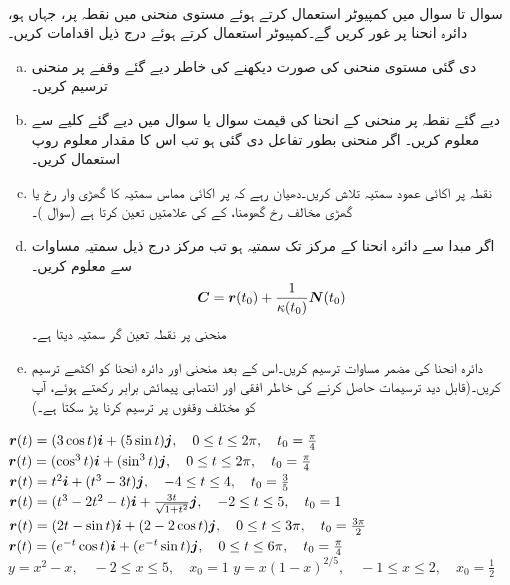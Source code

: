 \\
سوال  تا سوال  میں کمپیوٹر استعمال کرتے ہوئے مستوی منحنی میں   نقطہ  پر،   جہاں   ہو،   دائرہ انحنا   پر غور کریں گے۔کمپیوٹر استعمال کرتے ہوئے درج ذیل اقدامات  کریں۔
\begin{enumerate}[a.]
\item
دی گئی مستوی منحنی کی صورت دیکھنے کی خاطر دیے گئے وقفے  پر  منحنی ترسیم کریں۔
\item
دیے گئے نقطہ  پر منحنی کے  انحنا  کی قیمت   سوال  یا سوال  میں دیے گئے  کلیے سے معلوم کریں۔ اگر منحنی  بطور تفاعل  دی گئی ہو تب اس کا مقدار معلوم روپ  استعمال کریں۔
\item
نقطہ  پر اکائی عمود سمتیہ  تلاش کریں۔دھیان رہے کہ     پر اکائی مماس سمتیہ   کا گھڑی  وار  رخ یا گھڑی  مخالف رخ  گھومنا،    کے  کی علامتیں  تعین کرتا ہے (سوال )۔
\item
اگر مبدا سے دائرہ انحنا کے مرکز  تک سمتیہ  ہو تب مرکز  درج ذیل سمتیہ  مساوات سے معلوم کریں۔
\begin{align*}
{\ensuremath{{\boldsymbol{C}}}}={{\boldsymbol{r}}}(t_0)+\frac{1}{\kappa(t_0)}{{\boldsymbol{N}}}(t_0)
\end{align*}
منحنی پر نقطہ  تعین گر سمتیہ  دیتا ہے۔
\item
دائرہ انحنا کی مضمر مساوات  ترسیم کریں۔اس کے بعد منحنی اور دائرہ انحنا کو اکٹھے ترسیم کریں۔(قابل دید ترسیمات  حاصل کرنے کی خاطر افقی اور انتصابی پیمائش برابر رکھتے ہوئے،   آپ کو  مختلف وقفوں پر ترسیم کرنا  پڑ سکتا ہے۔)
\end{enumerate}

${{\boldsymbol{r}}}(t)=(3\cos t){\boldsymbol{i}}+(5\sin t){\boldsymbol{j}},\quad 0\le t\le 2\pi,\quad t_0=\tfrac{\pi}{4}$
${{\boldsymbol{r}}}(t)=(\cos^3t){\boldsymbol{i}}+(\sin^3t){\boldsymbol{j}},\quad 0\le t\le 2\pi,\quad t_0=\tfrac{\pi}{4}$
${{\boldsymbol{r}}}(t)=t^2{\boldsymbol{i}}+(t^3-3t){\boldsymbol{j}},\quad -4\le t\le 4,\quad t_0=\tfrac{3}{5}$
${{\boldsymbol{r}}}(t)=(t^3-2t^2-t){\boldsymbol{i}}+\tfrac{3t}{\sqrt{1+t^2}}{\boldsymbol{j}},\quad -2\le t\le 5,\quad t_0=1$
${{\boldsymbol{r}}}(t)=(2t-\sin t){\boldsymbol{i}}+(2-2\cos t){\boldsymbol{j}},\quad  0\le t\le 3\pi,\quad t_0=\tfrac{3\pi}{2}$
${{\boldsymbol{r}}}(t)=(e^{-t}\cos t){\boldsymbol{i}}+(e^{-t}\sin t){\boldsymbol{j}},\quad 0\le t\le 6\pi,\quad t_0=\tfrac{\pi}{4}$
$y=x^2-x,\quad -2\le x\le 5,\quad x_0=1$
$y=x(1-x)^{2/5},\quad -1\le x\le 2,\quad x_0=\tfrac{1}{2}$

